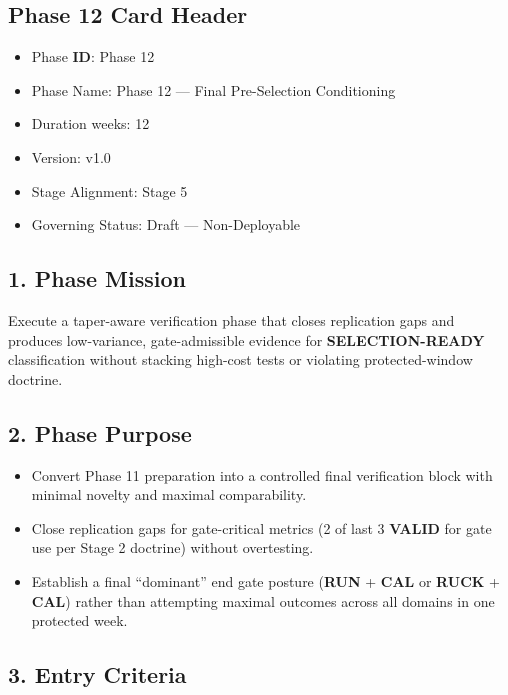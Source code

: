 \documentclass[10pt]{article}
\begin{document}
\subsection*{Phase 12 Card Header}
{}

\begin{itemize}
\item Phase \textbf{ID}: Phase 12
\item Phase Name: Phase 12 — Final Pre-Selection Conditioning
\item Duration weeks: 12
\item Version: v1.0
\item Stage Alignment: Stage 5
\item Governing Status: Draft — Non-Deployable
\end{itemize}

\subsection*{1. Phase Mission}


Execute a taper-aware verification phase that closes replication gaps and produces low-variance, gate-admissible evidence for \textbf{SELECTION-READY} classification without stacking high-cost tests or violating protected-window doctrine.

\subsection*{2. Phase Purpose}


\begin{itemize}
\item Convert Phase 11 preparation into a controlled final verification block with minimal novelty and maximal comparability.
\item Close replication gaps for gate-critical metrics (2 of last 3 \textbf{VALID} for gate use per Stage 2 doctrine) without overtesting.
\item Establish a final “dominant” end gate posture (\textbf{RUN} + \textbf{CAL} or \textbf{RUCK} + \textbf{CAL}) rather than attempting maximal outcomes across all domains in one protected week.
\end{itemize}

\subsection*{3. Entry Criteria}
\end{document}
